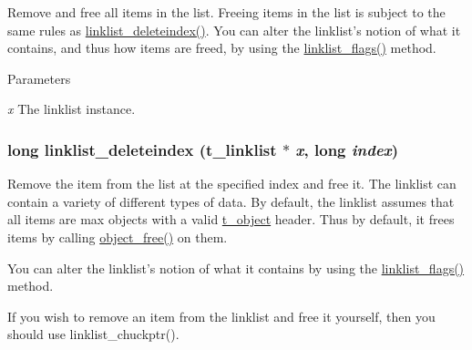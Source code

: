 Remove and free all items in the list. Freeing items in the list is subject to the same rules as \hyperlink{group__linklist_ga8a93071a90ca14ed02a32fa09f9e13f9}{linklist\_\-deleteindex()}. You can alter the linklist's notion of what it contains, and thus how items are freed, by using the \hyperlink{group__linklist_gacb89cb9e0a3b6c8e631dd00734643cdb}{linklist\_\-flags()} method.


\begin{DoxyParams}{Parameters}
\item[{\em x}]The linklist instance. \end{DoxyParams}
\hypertarget{group__linklist_ga8a93071a90ca14ed02a32fa09f9e13f9}{
\subsubsection[{linklist\_\-deleteindex}]{\setlength{\rightskip}{0pt plus 5cm}long linklist\_\-deleteindex ({\bf t\_\-linklist} $\ast$ {\em x}, \/  long {\em index})}}
\label{group__linklist_ga8a93071a90ca14ed02a32fa09f9e13f9}


Remove the item from the list at the specified index and free it. The linklist can contain a variety of different types of data. By default, the linklist assumes that all items are max objects with a valid \hyperlink{structt__object}{t\_\-object} header. Thus by default, it frees items by calling \hyperlink{group__obj_ga3759846cb356195532c41e35b87522ee}{object\_\-free()} on them.

You can alter the linklist's notion of what it contains by using the \hyperlink{group__linklist_gacb89cb9e0a3b6c8e631dd00734643cdb}{linklist\_\-flags()} method.

If you wish to remove an item from the linklist and free it yourself, then you should use linklist\_\-chuckptr().


